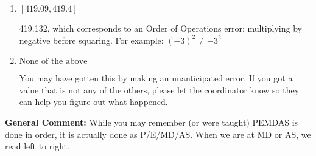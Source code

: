 \documentclass{extbook}[14pt]
\begin{document}
\begin{enumerate}
{\begin{enumerate}[label=\Alph*.]
 419.015, which corresponds to two Order of Operations errors.
\item \( [419.09, 419.4] \)

 419.132, which corresponds to an Order of Operations error: multiplying by negative before squaring. For example: $(-3)^2 \neq -3^2$
\item \( \text{None of the above} \)

 You may have gotten this by making an unanticipated error. If you got a value that is not any of the others, please let the coordinator know so they can help you figure out what happened.
\end{enumerate}

\textbf{General Comment:} While you may remember (or were taught) PEMDAS is done in order, it is actually done as P/E/MD/AS. When we are at MD or AS, we read left to right.
}
\end{enumerate}
\end{document}
